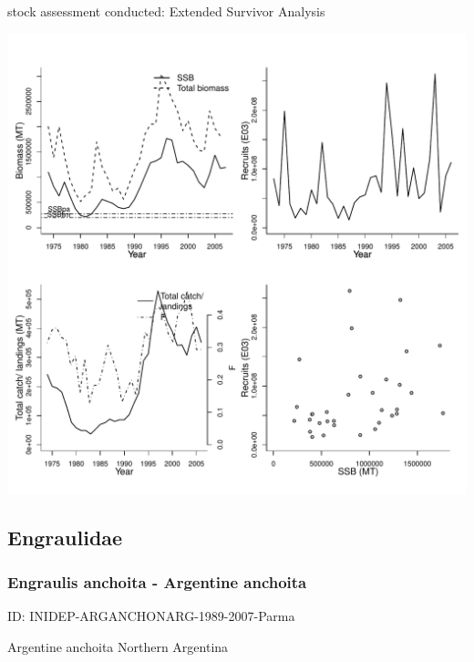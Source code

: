 stock assessment conducted: Extended Survivor Analysis 
\begin{center}
\vspace{-0.2cm}\includegraphics[scale=0.65]{../tex/figures/plot-WGBFAS-SPRAT22-32-1973-2007-JENNINGS.pdf}
\end{center}

\newpage
\subsection{Engraulidae}

\subsubsection{Engraulis anchoita - Argentine anchoita}
ID: INIDEP-ARGANCHONARG-1989-2007-Parma

Argentine anchoita Northern Argentina 


